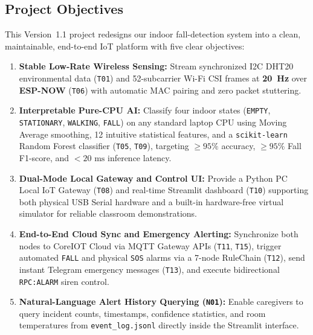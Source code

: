 \documentclass{hcmut-report}
\begin{document}
\subsection{Project Objectives}
This Version~1.1 project redesigns our indoor fall-detection system into a clean, maintainable, end-to-end IoT platform with five clear objectives:
\begin{enumerate}
  \item \textbf{Stable Low-Rate Wireless Sensing:} Stream synchronized I2C DHT20 environmental data (\texttt{T01}) and 52-subcarrier Wi-Fi CSI frames at \textbf{20~Hz} over \textbf{ESP-NOW} (\texttt{T06}) with automatic MAC pairing and zero packet stuttering.
  \item \textbf{Interpretable Pure-CPU AI:} Classify four indoor states (\texttt{EMPTY}, \texttt{STATIONARY}, \texttt{WALKING}, \texttt{FALL}) on any standard laptop CPU using Moving Average smoothing, 12 intuitive statistical features, and a \texttt{scikit-learn} Random Forest classifier (\texttt{T05}, \texttt{T09}), targeting $\geq 95\%$ accuracy, $\geq 95\%$ Fall F1-score, and $< 20\text{ ms}$ inference latency.
  \item \textbf{Dual-Mode Local Gateway and Control UI:} Provide a Python PC Local IoT Gateway (\texttt{T08}) and real-time Streamlit dashboard (\texttt{T10}) supporting both physical USB Serial hardware and a built-in hardware-free virtual simulator for reliable classroom demonstrations.
  \item \textbf{End-to-End Cloud Sync and Emergency Alerting:} Synchronize both nodes to CoreIOT Cloud via MQTT Gateway APIs (\texttt{T11}, \texttt{T15}), trigger automated \texttt{FALL} and physical \texttt{SOS} alarms via a 7-node RuleChain (\texttt{T12}), send instant Telegram emergency messages (\texttt{T13}), and execute bidirectional \texttt{RPC:ALARM} siren control.
  \item \textbf{Natural-Language Alert History Querying (\texttt{N01}):} Enable caregivers to query incident counts, timestamps, confidence statistics, and room temperatures from \texttt{event\_log.jsonl} directly inside the Streamlit interface.
\end{enumerate}
\end{document}
